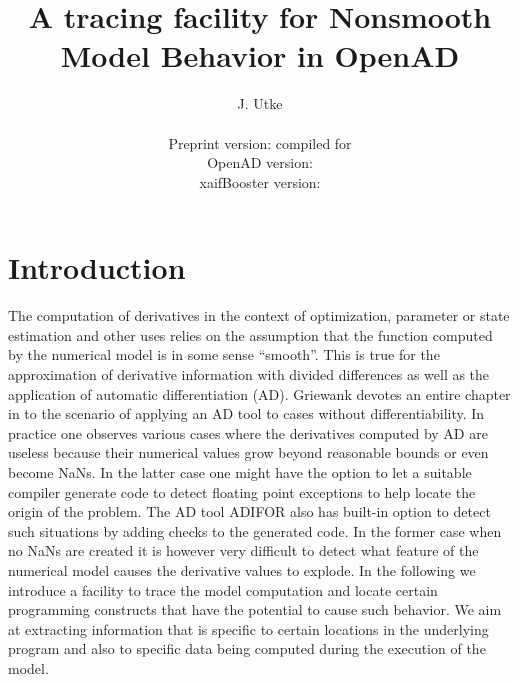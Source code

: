 \documentclass{article}
\title{A tracing facility for Nonsmooth Model Behavior in OpenAD}
\author{J. Utke\\\\
        \small Preprint version:  compiled for \\
        \small OpenAD version: \\
        \small xaifBooster version: \\
}
\date{ }
\begin{document}
\maketitle
{}
\lstset{basicstyle=\footnotesize\tt, 
	numbers=left, 
	numberstyle=\scriptsize,
  	stepnumber=1, 
	numbersep=10pt, 
	breaklines=true,
	resetmargins=false,
	xleftmargin=6ex,
	columns=fullflexible}
\section{Introduction}

The computation of derivatives in the context of optimization, parameter or state estimation 
and other uses relies on the assumption that the function computed by the numerical 
model is in some sense ``smooth''. 
This is true for the approximation of derivative information with divided differences 
as well as the application of automatic differentiation (AD). 
Griewank devotes an entire chapter in \cite{Gri00} 
to the scenario of applying an AD tool to cases without differentiability. 
In practice one observes various cases where the derivatives computed by AD are useless 
because their numerical values grow  beyond reasonable bounds \cite{tfs-delayed,tfs-chain} or even 
become NaNs. 
In the latter case one might have the option to let a suitable compiler generate 
code to detect floating point exceptions to help locate the origin of the problem.
The AD  tool ADIFOR \cite{adiforWeb} also has built-in  option to detect 
such situations by adding checks to the generated code.   
In the former case when no NaNs are created it is however very difficult to 
detect what feature of the numerical model causes the derivative values to explode. 
In the following we introduce a facility to trace the model computation and locate 
certain programming constructs that have the potential to cause 
such behavior. We aim at extracting information that is specific to 
certain locations in the underlying program and also to specific data 
being computed during the execution of the model.  
   
\end{document}
